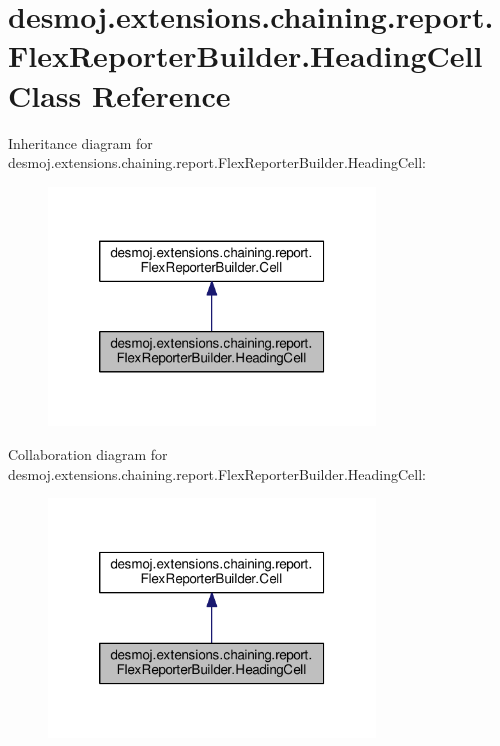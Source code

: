 \section{desmoj.\-extensions.\-chaining.\-report.\-Flex\-Reporter\-Builder.\-Heading\-Cell Class Reference}
\label{classdesmoj_1_1extensions_1_1chaining_1_1report_1_1_flex_reporter_builder_1_1_heading_cell}


Inheritance diagram for desmoj.\-extensions.\-chaining.\-report.\-Flex\-Reporter\-Builder.\-Heading\-Cell\-:
\nopagebreak
\begin{figure}[H]
\begin{center}
\leavevmode
\includegraphics[width=246pt]{classdesmoj_1_1extensions_1_1chaining_1_1report_1_1_flex_reporter_builder_1_1_heading_cell__inherit__graph}
\end{center}
\end{figure}


Collaboration diagram for desmoj.\-extensions.\-chaining.\-report.\-Flex\-Reporter\-Builder.\-Heading\-Cell\-:
\nopagebreak
\begin{figure}[H]
\begin{center}
\leavevmode
\includegraphics[width=246pt]{classdesmoj_1_1extensions_1_1chaining_1_1report_1_1_flex_reporter_builder_1_1_heading_cell__coll__graph}
\end{center}
\end{figure}
